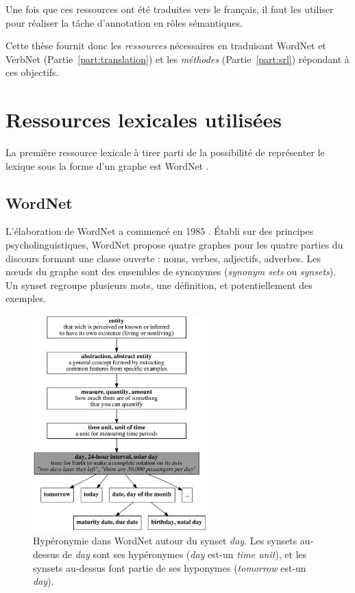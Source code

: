 Une fois que ces ressources ont été traduites vers le français, il faut les
utiliser pour réaliser la tâche d'annotation en rôles sémantiques.

Cette thèse fournit donc les \emph{ressources} nécessaires en traduisant
WordNet et VerbNet (Partie~\ref{part:translation}) et les \emph{méthodes}
(Partie~\ref{part:srl}) répondant à ces objectifs.

\section{Ressources lexicales utilisées}
\label{ressources_utilisees}

La première ressource lexicale à tirer parti de la possibilité de représenter
le lexique sous la forme d'un graphe est WordNet \citep{fellbaum1998wordnet}.

\subsection{WordNet}
\label{presentation_wordnet}

L'élaboration de WordNet a commencé en 1985 \citep{miller1990introduction}.
Établi sur des principes psycholinguistiques, WordNet propose quatre graphes
pour les quatre parties du discours formant une classe ouverte : noms, verbes,
adjectifs, adverbes. Les nœuds du graphe sont des ensembles de synonymes
(\emph{synonym sets} ou \emph{synsets}). Un synset regroupe plusieurs mots, une
définition, et potentiellement des exemples.


\begin{figure}[t]
    \centering
    \includegraphics[width=0.6\textwidth]{fig/wordnet_hypernymy.png}
    \caption{\label{fig:wordnet_hypernymy}Hypéronymie dans WordNet autour du
        synset \emph{day}. Les synsets au-dessus de \emph{day} sont ses hypéronymes
        (\emph{day} est-un \emph{time unit}), et les synsets au-dessus font partie de
        ses hyponymes (\emph{tomorrow} est-un \emph{day}).}
\end{figure}


